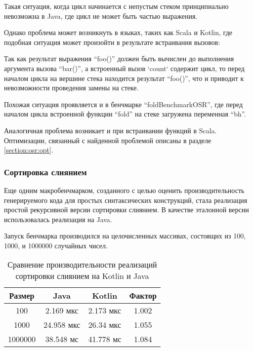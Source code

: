 \begin{verbatim}

\end{verbatim}

Такая ситуация, когда цикл начинается с непустым стеком принципиально невозможна в Java, где
цикл не может быть частью выражения.

Однако проблема может возникнуть в языках, таких как Scala и Kotlin, где подобная ситуация
может произойти в результате встраивания вызовов:

Так как результат выражения ``foo()'' должен быть вычислен до выполнения аргумента вызова
``bar()'', а встроенный вызов `count` содержит цикл, то перед началом цикла на вершине стека
находится результат ``foo()'', что и приводит к невозможности проведения замены на стеке.

Похожая ситуация проявляется и в бенчмарке ``foldBenchmarkOSR'', где перед началом
цикла встроенной функции ``fold'' на стеке загружена переменная ``bh''.

Аналогичная проблема возникает и при встраивании функций в Scala.
Оптимизации, связанный с найденной проблемой описаны в разделе \ref{section:osr:opt}.

\subsubsection{Сортировка слиянием}
Еще одним макробенчмарком, созданного с целью оценить производительность генерируемого
кода для простых синтаксических конструкций, стала реализация простой рекурсивной версии
сортировки слиянием.
В качестве эталонной версии использовалась реализация на Java.

Запуск бенчмарка производился на целочисленных массивах, состоящих из 100, 1000, и 1000000 случайных
чисел.

\begin{table}[h]
\begin{center}
\begin{tabular}{|c|c|c|c|} \hline
Размер & Java & Kotlin & Фактор \\ \hline
100 & 2.169 мкс & 2.173 мкс & 1.002\\ \hline
1000 & 24.958 мкс & 26.34 мкс & 1.055\\ \hline
1000000 & 38.548 мс & 41.778 мс & 1.084\\ \hline
\end{tabular}
\caption{Сравнение производительности реализаций сортировки слиянием на Kotlin и Java}
\label{bm:mergesort}
\end{center}
\end{table}

